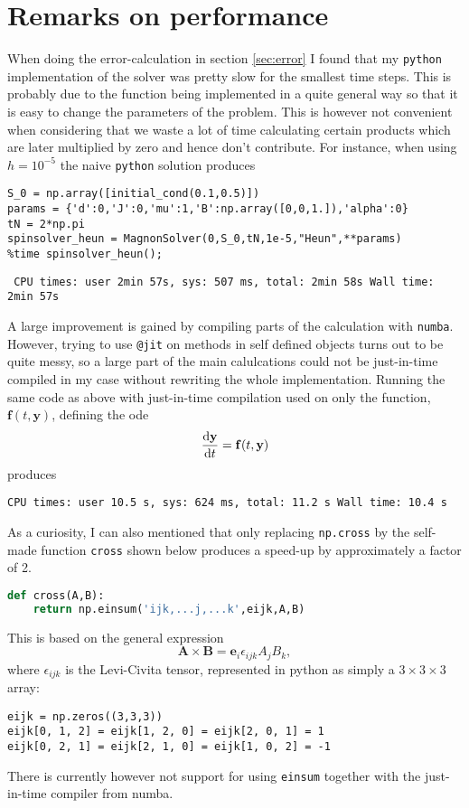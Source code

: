 \section{Remarks on performance}
When doing the error-calculation in section \ref{sec:error} I found that my \texttt{python} implementation of the solver was pretty slow for the smallest time steps. This is probably due to the function being implemented in a quite general way so that it is easy to change the parameters of the problem. This is however not convenient when considering that we waste a lot of time calculating certain products which are later multiplied by zero and hence don't contribute. For instance, when using $h = 10^{-5}$ the naive \texttt{python} solution produces
\begin{lstlisting}
S_0 = np.array([initial_cond(0.1,0.5)])
params = {'d':0,'J':0,'mu':1,'B':np.array([0,0,1.]),'alpha':0}
tN = 2*np.pi
spinsolver_heun = MagnonSolver(0,S_0,tN,1e-5,"Heun",**params)
%time spinsolver_heun();
\end{lstlisting}
\texttt{\small
	CPU times: user 2min 57s, sys: 507 ms, total: 2min 58s
	Wall time: 2min 57s
}

A large improvement is gained by compiling parts of the calculation with \texttt{numba}. However, trying to use \texttt{@jit} on methods in self defined objects turns out to be quite messy, so a large part of the main calulcations could not be just-in-time compiled in my case without rewriting the whole implementation. Running the same code as above with just-in-time compilation used on only the function, $\mathbf{f}(t,\mathbf{y})$, defining the ode 
$$
	\frac{\text{d} \mathbf{y}}{\text{d} t} = \mathbf{f}(t,\mathbf{y})
$$	 
produces

\texttt{\small CPU times: user 10.5 s, sys: 624 ms, total: 11.2 s
Wall time: 10.4 s
}

As a curiosity, I can also mentioned that only replacing \texttt{np.cross} by the self-made function \texttt{cross} shown below produces a speed-up by approximately a factor of 2.
\begin{lstlisting}[language = Python]
def cross(A,B):
	return np.einsum('ijk,...j,...k',eijk,A,B)
\end{lstlisting}

This is based on the general expression
$$
	\mathbf{A} \times \mathbf{B} = \mathbf{e}_i \epsilon_{ijk} A_j B_k,
$$
where $\epsilon_{ijk}$ is the Levi-Civita tensor, represented in python as simply a $3\times3\times3$ array:
\begin{lstlisting}
eijk = np.zeros((3,3,3))
eijk[0, 1, 2] = eijk[1, 2, 0] = eijk[2, 0, 1] = 1
eijk[0, 2, 1] = eijk[2, 1, 0] = eijk[1, 0, 2] = -1
\end{lstlisting}
There is currently however not support for using \texttt{einsum} together with the just-in-time compiler from numba.

